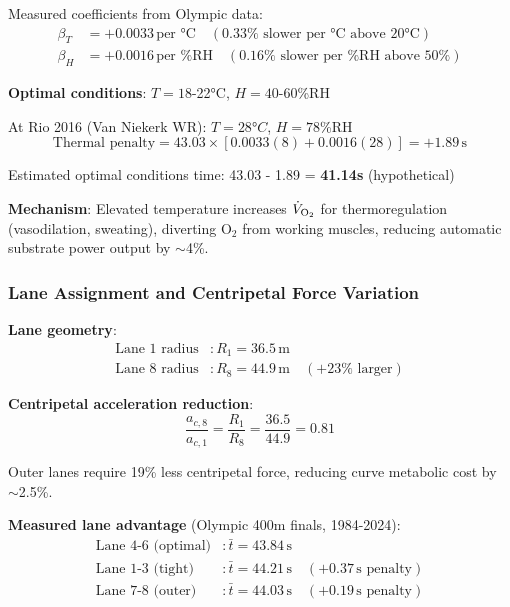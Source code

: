 \documentclass[11pt,onecolumn]{article}
\begin{document}
Measured coefficients from Olympic data:
\begin{align}
\beta_T &= +0.0033\,\text{per °C} \quad (0.33\% \text{ slower per °C above 20°C}) \\
\beta_H &= +0.0016\,\text{per \%RH} \quad (0.16\% \text{ slower per \%RH above 50\%})
\end{align}

\textbf{Optimal conditions}: $T = 18$-22°C, $H = 40$-60\%RH

At Rio 2016 (Van Niekerk WR): $T = 28°C$, $H = 78$\%RH
\begin{equation}
\text{Thermal penalty} = 43.03 \times [0.0033(8) + 0.0016(28)] = +1.89\,\text{s}
\end{equation}

Estimated optimal conditions time: 43.03 - 1.89 = \textbf{41.14s} (hypothetical)

\textbf{Mechanism}: Elevated temperature increases $\dot{V}_{\ce{O2}}$ for thermoregulation (vasodilation, sweating), diverting O$_2$ from working muscles, reducing automatic substrate power output by $\sim$4\%.

\subsubsection{Lane Assignment and Centripetal Force Variation}

\textbf{Lane geometry}:
\begin{align}
\text{Lane 1 radius} &: R_1 = 36.5\,\text{m} \\
\text{Lane 8 radius} &: R_8 = 44.9\,\text{m} \quad (+23\% \text{ larger})
\end{align}

\textbf{Centripetal acceleration reduction}:
\begin{equation}
\frac{a_{c,8}}{a_{c,1}} = \frac{R_1}{R_8} = \frac{36.5}{44.9} = 0.81
\end{equation}

Outer lanes require 19\% less centripetal force, reducing curve metabolic cost by $\sim$2.5\%.

\textbf{Measured lane advantage} (Olympic 400m finals, 1984-2024):
\begin{align}
\text{Lane 4-6 (optimal)} &: \bar{t} = 43.84\,\text{s} \\
\text{Lane 1-3 (tight)} &: \bar{t} = 44.21\,\text{s} \quad (+0.37\,\text{s penalty}) \\
\text{Lane 7-8 (outer)} &: \bar{t} = 44.03\,\text{s} \quad (+0.19\,\text{s penalty})
\end{align}
\end{document}
